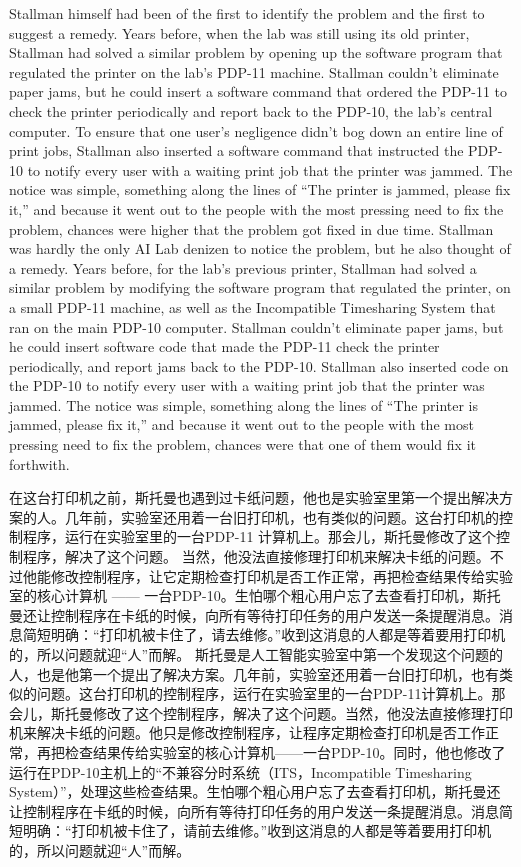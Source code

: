 \ifdefined\eng
\ifdefined\vone
Stallman himself had been of the first to identify the problem and the first to suggest a remedy. Years before, when the lab was still using its old printer, Stallman had solved a similar problem by opening up the software program that regulated the printer on the lab's PDP-11 machine. Stallman couldn't eliminate paper jams, but he could insert a software command that ordered the PDP-11 to check the printer periodically and report back to the PDP-10, the lab's central computer. To ensure that one user's negligence didn't bog down an entire line of print jobs, Stallman also inserted a software command that instructed the PDP-10 to notify every user with a waiting print job that the printer was jammed. The notice was simple, something along the lines of ``The printer is jammed, please fix it,'' and because it went out to the people with the most pressing need to fix the problem, chances were higher that the problem got fixed in due time.
\fi
\ifdefined\vtwo
Stallman was hardly the only AI Lab denizen to notice the problem, but he also thought of a remedy. Years before, for the lab's previous printer, Stallman had solved a similar problem by modifying the software program that regulated the printer, on a small PDP-11 machine, as well as the Incompatible Timesharing System that ran on the main PDP-10 computer. Stallman couldn't eliminate paper jams, but he could insert software code that made the PDP-11 check the printer periodically, and report jams back to the PDP-10. Stallman also inserted code on the PDP-10 to notify every user with a waiting print job that the printer was jammed. The notice was simple, something along the lines of ``The printer is jammed, please fix it,'' and because it went out to the people with the most pressing need to fix the problem, chances were that one of them would fix it forthwith.
\fi
\fi

\ifdefined\chs
\ifdefined\vone
在这台打印机之前，斯托曼也遇到过卡纸问题，他也是实验室里第一个提出解决方案的人。几年前，实验室还用着一台旧打印机，也有类似的问题。这台打印机的控制程序，运行在实验室里的一台PDP-11 计算机上。那会儿，斯托曼修改了这个控制程序，解决了这个问题。
当然，他没法直接修理打印机来解决卡纸的问题。不过他能修改控制程序，让它定期检查打印机是否工作正常，再把检查结果传给实验室的核心计算机
——
一台PDP-10。生怕哪个粗心用户忘了去查看打印机，斯托曼还让控制程序在卡纸的时候，向所有等待打印任务的用户发送一条提醒消息。消息简短明确：``打印机被卡住了，请去维修。''收到这消息的人都是等着要用打印机的，所以问题就迎``人''而解。
\fi
\ifdefined\vtwo
斯托曼是人工智能实验室中第一个发现这个问题的人，也是他第一个提出了解决方案。几年前，实验室还用着一台旧打印机，也有类似的问题。这台打印机的控制程序，运行在实验室里的一台PDP-11计算机上。那会儿，斯托曼修改了这个控制程序，解决了这个问题。当然，他没法直接修理打印机来解决卡纸的问题。他只是修改控制程序，让程序定期检查打印机是否工作正常，再把检查结果传给实验室的核心计算机——一台PDP-10。同时，他也修改了运行在PDP-10主机上的``不兼容分时系统（ITS，Incompatible Timesharing System）''，处理这些检查结果。生怕哪个粗心用户忘了去查看打印机，斯托曼还让控制程序在卡纸的时候，向所有等待打印任务的用户发送一条提醒消息。消息简短明确：``打印机被卡住了，请前去维修。''收到这消息的人都是等着要用打印机的，所以问题就迎``人''而解。
\fi
\fi

